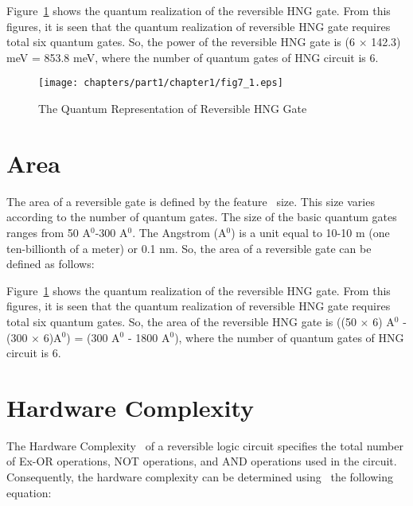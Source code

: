\begin{example}\textnormal{
Figure~\ref{fig:p1_c1_fig7_1} shows the quantum realization of the reversible HNG gate. From this figures, it is seen that the quantum realization of reversible HNG gate requires total six quantum gates. So, the power of the reversible HNG gate is (6 $\times$ 142.3) meV = 853.8 meV, where the number of quantum gates of HNG circuit is 6.}
\end{example}


\begin{figure}[H]
\centering
\texttt{[image: chapters/part1/chapter1/fig7\_1.eps]}
\caption{The Quantum Representation of Reversible HNG Gate}
\label{fig:p1_c1_fig7_1}
\end{figure}

\section{Area}
The area of a reversible gate is defined by the feature~ size. This size varies~ according to the number of quantum gates. The size of the basic quantum gates ranges from 50 A$^0$-300 A$^0$. The Angstrom (A$^0$) is a unit equal to 10-10 m (one ten-billionth of a meter) or 0.1 nm. So, the area of a reversible gate can be defined as follows:


\begin{example}\textnormal{
Figure~\ref{fig:p1_c1_fig7_1} shows the quantum realization of the reversible HNG gate. From this figures, it is seen that the quantum realization of reversible HNG gate requires total six quantum gates. So, the area of the reversible HNG gate is ((50 $\times$ 6) A$^0$ - (300 $\times$ 6)A$^0$) = (300 A$^0$ - 1800 A$^0$), where the number of quantum gates of HNG circuit is 6.}
\end{example}



\section{Hardware Complexity}
The Hardware Complexity~ of a reversible logic circuit specifies the total number of Ex-OR operations, NOT operations, and AND operations used in the circuit. Consequently, the hardware complexity can be determined using~ the following equation:

